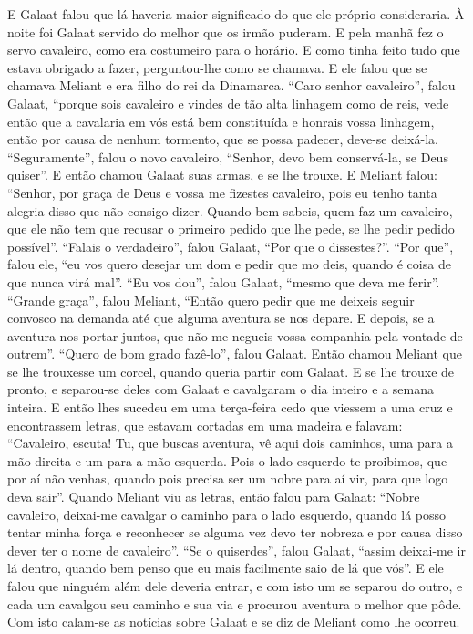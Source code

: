 E Galaat falou que lá haveria maior significado do que ele próprio consideraria.
À noite foi Galaat servido do melhor que os irmão puderam. E pela manhã fez o
servo cavaleiro, como era costumeiro para o horário. E como tinha feito tudo
que estava obrigado a fazer, perguntou-lhe como se chamava. E ele falou que se
chamava Meliant e era filho do rei da Dinamarca. “Caro senhor cavaleiro”, falou
Galaat, “porque sois cavaleiro e vindes de tão alta linhagem como de reis, vede
então que a cavalaria em vós está bem constituída e honrais vossa linhagem,
então por causa de nenhum tormento, que se possa padecer, deve-se deixá-la.
“Seguramente”, falou o novo cavaleiro, “Senhor, devo bem conservá-la, se Deus
quiser”. E então chamou Galaat suas armas, e se lhe trouxe. E Meliant falou:
“Senhor, por graça de Deus e vossa me fizestes cavaleiro, pois eu tenho tanta
alegria disso que não consigo dizer. Quando bem sabeis, quem faz um cavaleiro,
que ele não tem que recusar o primeiro pedido que lhe pede, se lhe pedir pedido
possível”. “Falais o verdadeiro”, falou Galaat, “Por que o dissestes?”. “Por
que”, falou ele, “eu vos quero desejar um dom e pedir que mo deis, quando é
coisa de que nunca virá mal”. “Eu vos dou”, falou Galaat, “mesmo que deva me
ferir”. “Grande graça”, falou Meliant, “Então quero pedir que me
deixeis seguir convosco na demanda até que alguma aventura se nos depare. E
depois, se a aventura nos portar juntos, que não me negueis vossa companhia
pela vontade de outrem”. “Quero de bom grado fazê-lo”, falou Galaat. Então
chamou Meliant que se lhe trouxesse um corcel, quando queria partir com Galaat.
E se lhe trouxe de pronto, e separou-se deles com Galaat e cavalgaram o dia
inteiro e a semana inteira. E então lhes sucedeu em uma terça-feira cedo que
viessem a uma cruz e encontrassem letras,  que estavam cortadas em uma madeira
e falavam: “Cavaleiro, escuta! Tu, que buscas aventura, vê aqui dois caminhos,
uma para a mão direita e um para a mão esquerda. Pois o lado esquerdo te
proibimos, que por aí não venhas, quando pois precisa ser um nobre para aí vir,
para que logo deva sair”. Quando Meliant viu as letras, então falou para
Galaat: “Nobre cavaleiro, deixai-me cavalgar o caminho para o lado esquerdo,
quando lá posso tentar minha força e reconhecer se alguma vez devo ter nobreza
e por causa disso dever ter o nome de cavaleiro”. “Se o quiserdes”,
falou Galaat, “assim deixai-me ir lá dentro, quando bem penso que eu mais
facilmente saio de lá que vós”. E ele falou que ninguém além dele deveria
entrar, e com isto um se separou do outro, e cada um cavalgou seu caminho e sua
via e procurou aventura o melhor que pôde. Com isto calam-se as notícias sobre
Galaat e se diz de Meliant como lhe ocorreu.

